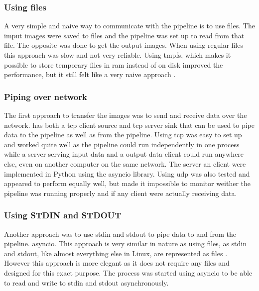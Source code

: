 \subsubsection{Using files}
A very simple and naive way to communicate with the pipeline is to use files.
The imput images were saved to files and the pipeline was set up to read from that file.
The opposite was done to get the output images.
When using regular files this approach was slow and not very reliable.
Using \gls{tmpfs}, which makes it possible to store temporary files in \gls{ram} instead of on disk improved the performance, but it still felt like a very naive approach \cite{dickinsTmpfsLinuxKernel2010}.

\subsubsection{Piping over network}
The first approach to transfer the images was to send and receive data over the network.
\gs has both a \gls{tcp} client source and \gls{tcp} server sink that can be used to pipe data to the pipeline as well as from the pipeline.
Using \gls{tcp} was easy to set up and worked quite well as the pipeline could run independently in one process while a server serving input data and a output data client could run anywhere else, even on another computer on the same network.
The server an client were implemented in Python using the \gls{asyncio} library.
Using \gls{udp} was also tested and appeared to perform equally well, but made it impossible to monitor weither the pipeline was running properly and if any client were actually receiving data.


\subsubsection{Using STDIN and STDOUT}
Another approach was to use \gls{stdin} and \gls{stdout} to pipe data to and from the pipeline.
\gls{asyncio}.
This approach is very similar in nature as using files, as \gls{stdin} and \gls{stdout}, like almost everything else in Linux, are represented as files \cite{mckayWhatAreStdin2020}.
However this approach is more elegant as it does not require any files and designed for this exact purpose.
The \gs process was started using \gls{asyncio} to be able to read and write to \gls{stdin} and \gls{stdout} asynchronously.




\

